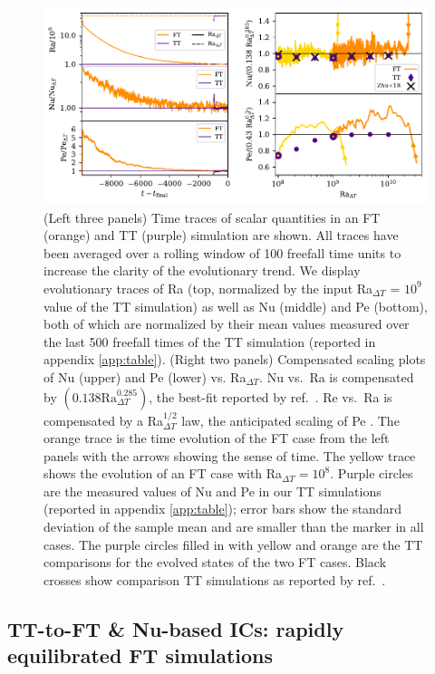 \documentclass[aps, pre, onecolumn, nofootinbib, notitlepage, groupedaddress, amsfonts, amssymb, amsmath, longbibliography, superscriptaddress]{revtex4-1}
\begin{document}
\begin{figure}[t!]
\includegraphics[width=\textwidth]{./figs/rbc_scalar_comparisons.pdf}
\caption{ 
	(Left three panels) Time traces of scalar quantities in an FT (orange) and TT (purple) simulation are shown.
	All traces have been averaged over a rolling window of 100 freefall time units to increase the clarity of the evolutionary trend.
	We display evolutionary traces of Ra (top, normalized by the input Ra$_{\Delta T}$ = $10^9$ value of the TT simulation) as well as Nu (middle) and Pe (bottom), both of which are normalized by their mean values measured over the last 500 freefall times of the TT simulation (reported in appendix \ref{app:table}).
	(Right two panels) Compensated scaling plots of Nu (upper) and Pe (lower) vs. Ra$_{\Delta T}$.
	Nu vs.~Ra is compensated by $(0.138 \text{Ra}_{\Delta T}^{0.285})$, the best-fit reported by ref.~\cite{johnston&doering2009}.
	Re vs.~Ra is compensated by a Ra$_{\Delta T}^{1/2}$ law, the anticipated scaling of Pe \cite{ahlers&all2009}.
	The orange trace is the time evolution of the FT case from the left panels with the arrows showing the sense of time.
	The yellow trace shows the evolution of an FT case with Ra$_{\Delta T} = 10^8$.
	Purple circles are the measured values of Nu and Pe in our TT simulations (reported in appendix \ref{app:table}); error bars show the standard deviation of the sample mean and are smaller than the marker in all cases.
	The purple circles filled in with yellow and orange are the TT comparisons for the evolved states of the two FT cases.
	Black crosses show comparison TT simulations as reported by ref.~\cite{zhu&all2018}.
\label{fig:rbc_scalar_comparisons} }
\end{figure}



\subsection{TT-to-FT \& Nu-based ICs: rapidly equilibrated FT simulations}
\label{sec:tt-to-ft}
\end{document}
